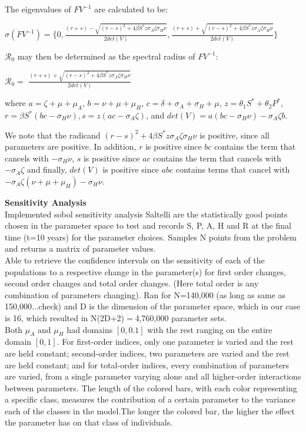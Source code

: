 \documentclass[12pt]{article}
\begin{document}
The eigenvalues of $FV^{-1}$ are calculated to be: 
\begin{center}
$\sigma (FV^{-1}) = \{0, \frac{(r+s)-\sqrt{(r-s)^2+4\beta S^* z  \sigma_A \zeta \sigma_H \nu}}{2det(V)} 
, \frac{(r+s)+\sqrt{(r-s)^2+4\beta S^* z  \sigma_A \zeta \sigma_H \nu}}{2det(V)} 
\}$
\end{center}

$\mathscr{R}_0$ may then be determined as the spectral radius of $FV^{-1}$:
\begin{center}
$\mathscr{R}_0=$ $\frac{(r+s)+\sqrt{(r-s)^2+4\beta S^* z  \sigma_A \zeta \sigma_H \nu}}{2det(V)} $
\end{center}
where $a=\zeta +\mu + \mu_A$, $b=\nu + \mu + \mu_H$, $c=\delta + \sigma_A + \sigma_H +\mu$, $z=\theta_1 S^* + \theta_2 P^*$, $ r=\beta S^* (bc-\sigma_H \nu), s=z(ac-\sigma_{A} \zeta)$, and $det(V)=a(bc-\sigma_H\nu)-\sigma_A\zeta b$.

We note that the radicand $(r-s)^2+4\beta S^* z  \sigma_A \zeta \sigma_H \nu$ is positive, since all parameters are positive. In addition, $r$ is positive since $bc$ contains the term that cancels with $-\sigma_{H} \nu$,  $s$ is positive since $ac$ contains the term that cancels with $-\sigma_{A} \zeta$ and finally, $det(V)$ is positive since $abc$ contains terms that cancel with $-\sigma_A\zeta(\nu+\mu+\mu_H)-\sigma_H\nu$. 


\textbf{Sensitivity Analysis} \\

Implemented sobol sensitivity analysis 
Saltelli are the statistically good points chosen in the parameter space to test and records S, P, A, H and R at the final time (t=10 years) for the parameter choices. Samples N points from the problem and returns a matrix of parameter values. \\

Able to retrieve the confidence intervals on the sensitivity of each of the populations to a respective change in the parameter(s) for first order changes, second order changes and total order changes. (Here total order is any combination of parameters changing). Ran for N=140,000 (as long as same as 150,000...check) and D is the dimension of the parameter space, which in our case is 16, which resulted in N(2D+2)$=$4,760,000 parameter sets. \\

Both $\mu_{A}$ and $\mu_{H}$ had domains $[0,0.1]$ with the rest ranging on the entire domain $[0,1]$. 
For first-order indices, only one parameter is varied and the rest are held constant; second-order indices, two parameters are varied and the rest are held constant; and for total-order indices, every combination of parameters are varied, from a single parameter varying alone and all higher-order interactions between parameters. The length of the colored bars, with each color representing a specific class, measures the contribution of a certain parameter to the variance each of the classes in the model.The longer the colored bar, the higher the effect the parameter has on that class of individuals. \\
\end{document}
